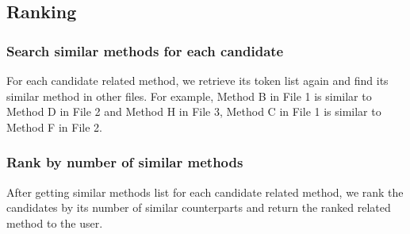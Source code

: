 \subsection{Ranking}
\subsubsection{Search similar methods for each candidate}
For each candidate related method, we retrieve its token list again and find its similar method in other files. For example, Method B in File 1 is similar to Method D in File 2 and Method H in File 3, Method C in File 1 is similar to Method F in File 2. 

\subsubsection{Rank by number of similar methods}
After getting similar methods list for each candidate related method, we rank the candidates by its number of similar counterparts and return the ranked related method to the user.